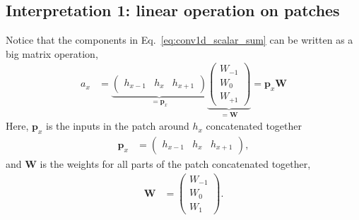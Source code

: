 \documentclass{article}
\newcommand{\W}{\mathbf{W}}
\newcommand{\h}{\mathbf{h}}
\newcommand{\p}{\mathbf{p}}
\newcommand{\Cin}{C_\text{in}}
\newcommand{\Cout}{C_\text{out}}
\begin{document}
\subsection{Interpretation 1: linear operation on patches}
Notice that the components in Eq.~\eqref{eq:conv1d_scalar_sum} can be written as a big matrix operation,
\begin{align}
  a_{x} &= 
  \underbrace{\begin{pmatrix}
    h_{x-1} &
    h_{x} &
    h_{x+1}
  \end{pmatrix}
  }_{=\p_x}
  \underbrace{\begin{pmatrix}
    W_{-1} \\
    W_{0} \\
    W_{+1}
  \end{pmatrix}}_{=\W}
  = \p_x \W
\end{align}
Here, $\p_x$ is the inputs in the patch around $h_x$ concatenated together
\begin{align}
  \p_{x} &= \begin{pmatrix} 
    h_{x-1} &
    h_{x} &
    h_{x+1}
  \end{pmatrix},
\end{align}
and $\W$ is the weights for all parts of the patch concatenated together,
\begin{align}
  \W &= \begin{pmatrix}
    W_{-1} \\
    W_{0} \\
    W_{1}
  \end{pmatrix}.
\end{align}


\end{document}

